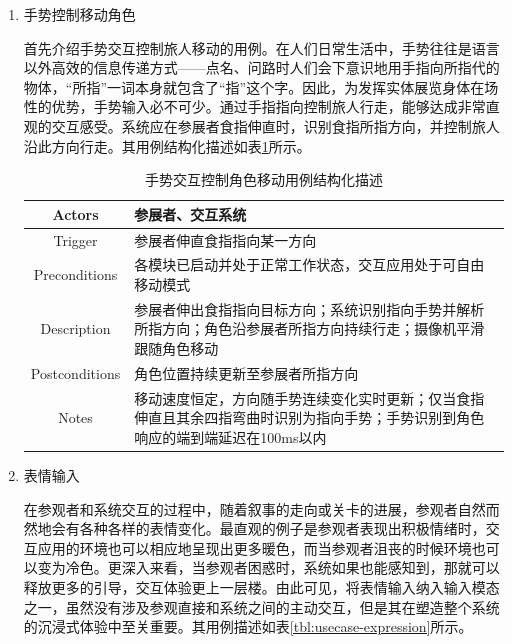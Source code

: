 \documentclass[bachelor]{njupthesis}
\begin{document}
\begin{enumerate}
\item 手势控制移动角色

首先介绍手势交互控制旅人移动的用例。在人们日常生活中，手势往往是语言以外高效的信息传递方式——点名、问路时人们会下意识地用手指向所指代的物体，“所指”一词本身就包含了“指”这个字。因此，为发挥实体展览身体在场性的优势，手势输入必不可少。通过手指指向控制旅人行走，能够达成非常直观的交互感受。系统应在参展者食指伸直时，识别食指所指方向，并控制旅人沿此方向行走。其用例结构化描述如表\ref{tbl:usecase-gesture}所示。

\begin{table}[h]
\centering
\caption{手势交互控制角色移动用例结构化描述}
\begin{tabularx}{\linewidth}{cX}
\toprule
Actors & 参展者、交互系统 \\
\midrule
Trigger & 参展者伸直食指指向某一方向 \\
Preconditions & 各模块已启动并处于正常工作状态，交互应用处于可自由移动模式 \\
Description & 参展者伸出食指指向目标方向；系统识别指向手势并解析所指方向；角色沿参展者所指方向持续行走；摄像机平滑跟随角色移动 \\
Postconditions & 角色位置持续更新至参展者所指方向 \\
Notes & 移动速度恒定，方向随手势连续变化实时更新；仅当食指伸直且其余四指弯曲时识别为指向手势；手势识别到角色响应的端到端延迟在100ms以内 \\
\bottomrule
\end{tabularx}
\label{tbl:usecase-gesture}
\end{table}

\item 表情输入

在参观者和系统交互的过程中，随着叙事的走向或关卡的进展，参观者自然而然地会有各种各样的表情变化。最直观的例子是参观者表现出积极情绪时，交互应用的环境也可以相应地呈现出更多暖色，而当参观者沮丧的时候环境也可以变为冷色。更深入来看，当参观者困惑时，系统如果也能感知到，那就可以释放更多的引导，交互体验更上一层楼。由此可见，将表情输入纳入输入模态之一，虽然没有涉及参观直接和系统之间的主动交互，但是其在塑造整个系统的沉浸式体验中至关重要。其用例描述如表\ref{tbl:usecase-expression}所示。


\end{enumerate}
\end{document}
